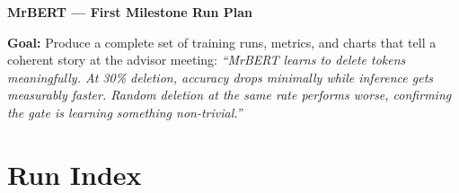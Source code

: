 \documentclass[11pt,a4paper]{article}
\begin{document}
\begin{center}
    {\LARGE \textbf{MrBERT --- First Milestone Run Plan}}\\[1em]
\end{center}

\textbf{Goal:} Produce a complete set of training runs, metrics, and charts that tell a coherent story at the advisor meeting: \emph{``MrBERT learns to delete tokens meaningfully. At 30\% deletion, accuracy drops minimally while inference gets measurably faster. Random deletion at the same rate performs worse, confirming the gate is learning something non-trivial.''}

\tableofcontents
\bigskip


\section{Run Index}
\label{sec:run-index}
\end{document}
